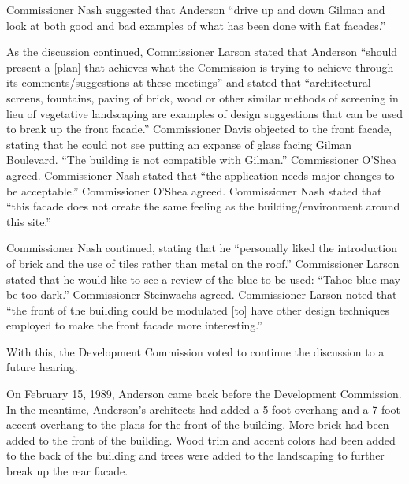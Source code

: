 Commissioner Nash suggested that Anderson ``drive up and down Gilman and look at
both good and bad examples of what has been done with flat facades.''

As the discussion continued, Commissioner Larson stated that Anderson ``should
present a [plan] that achieves what the Commission is trying to achieve through
its comments/suggestions at these meetings'' and stated that ``architectural
screens, fountains, paving of brick, wood or other similar methods of screening
in lieu of vegetative landscaping are examples of design suggestions that can be
used to break up the front facade.'' Commissioner Davis objected to the front
facade, stating that he could not see putting an expanse of glass facing Gilman
Boulevard. ``The building is not compatible with Gilman.'' Commissioner O'Shea
agreed. Commissioner Nash stated that ``the application needs major changes to
be acceptable.'' Commissioner O'Shea agreed. Commissioner Nash stated that
``this facade does not create the same feeling as the building/environment
around this site.''

Commissioner Nash continued, stating that he ``personally liked the introduction
of brick and the use of tiles rather than metal on the roof.'' Commissioner
Larson stated that he would like to see a review of the blue to be used: ``Tahoe
blue may be too dark.'' Commissioner Steinwachs agreed. Commissioner Larson
noted that ``the front of the building could be modulated [to] have other design
techniques employed to make the front facade more interesting.''

With this, the Development Commission voted to continue the discussion to a
future hearing.

On February 15, 1989, Anderson came back before the Development Commission. In
the meantime, Anderson's architects had added a 5-foot overhang and a 7-foot
accent overhang to the plans for the front of the building. More brick had been
added to the front of the building. Wood trim and accent colors had been added
to the back of the building and trees were added to the landscaping to further
break up the rear facade.


